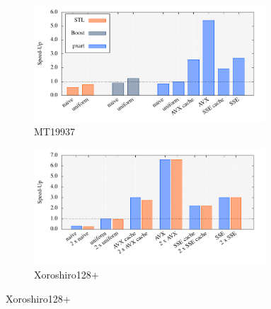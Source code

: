 \documentclass{stdlocal}
\begin{document}
  \begin{figure}[H]
    \center
    \begin{subfigure}[b]{\textwidth}
      \center
      \includegraphics[width=0.95\textwidth]{plots/monte_carlo_pi_laptop_mt19937.pdf}
      \caption{MT19937}
    \end{subfigure}

    \begin{subfigure}[b]{\textwidth}
      \center
      \includegraphics[width=0.95\textwidth]{plots/monte_carlo_pi_laptop_xrsr128p.pdf}
      \caption{Xoroshiro128+}
    \end{subfigure}


\end{figure}
\end{document}
